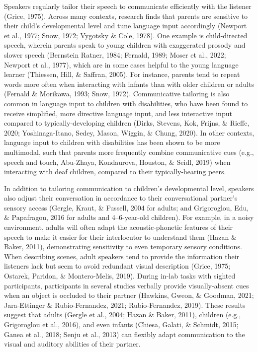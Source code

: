 \documentclass[
  man,floatsintext]{apa6}
\begin{document}
Speakers regularly tailor their speech to communicate efficiently with the listener (Grice, 1975). Across many contexts, research finds that parents are sensitive to their child's developmental level and tune language input accordingly (Newport et al., 1977; Snow, 1972; Vygotsky \& Cole, 1978). One example is child-directed speech, wherein parents speak to young children with exaggerated prosody and slower speech (Bernstein Ratner, 1984; Fernald, 1989; Moser et al., 2022; Newport et al., 1977), which are in some cases helpful to the young language learner (Thiessen, Hill, \& Saffran, 2005). For instance, parents tend to repeat words more often when interacting with infants than with older children or adults (Fernald \& Morikawa, 1993; Snow, 1972). Communicative tailoring is also common in language input to children with disabilities, who have been found to receive simplified, more directive language input, and less interactive input compared to typically-developing children (Dirks, Stevens, Kok, Frijns, \& Rieffe, 2020; Yoshinaga-Itano, Sedey, Mason, Wiggin, \& Chung, 2020). In other contexts, language input to children with disabilities has been shown to be more multimodal, such that parents more frequently combine communicative cues (e.g., speech and touch, Abu-Zhaya, Kondaurova, Houston, \& Seidl, 2019) when interacting with deaf children, compared to their typically-hearing peers.

In addition to tailoring communication to children's developmental level, speakers also adjust their conversation in accordance to their conversational partner's sensory access (Gergle, Kraut, \& Fussell, 2004 for adults; and Grigoroglou, Edu, \& Papafragou, 2016 for adults and 4--6-year-old children). For example, in a noisy environment, adults will often adapt the acoustic-phonetic features of their speech to make it easier for their interlocutor to understand them (Hazan \& Baker, 2011), demonstrating sensitivity to even temporary sensory conditions. When describing scenes, adult speakers tend to provide the information their listeners lack but seem to avoid redundant visual description (Grice, 1975; Ostarek, Paridon, \& Montero-Melis, 2019). During in-lab tasks with sighted participants, participants in several studies verbally provide visually-absent cues when an object is occluded to their partner (Hawkins, Gweon, \& Goodman, 2021; Jara-Ettinger \& Rubio-Fernandez, 2021; Rubio-Fernandez, 2019). These results suggest that adults (Gergle et al., 2004; Hazan \& Baker, 2011), children (e.g., Grigoroglou et al., 2016), and even infants (Chiesa, Galati, \& Schmidt, 2015; Ganea et al., 2018; Senju et al., 2013) can flexibly adapt communication to the visual and auditory abilities of their partner.
\end{document}
